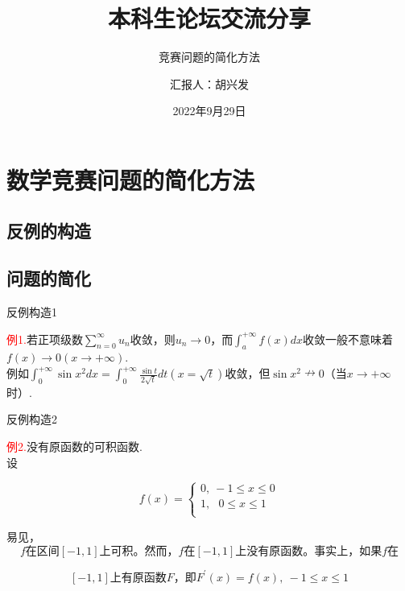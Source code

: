 \documentclass{beamer}
\author{汇报人：胡兴发} %
\title{本科生论坛交流分享} %
\subtitle{竞赛问题的简化方法} %
\institute{数理科学学院}
\date{2022年9月29日} %
\institute[IaHS]{指导老师：张本龚}
\begin{document}
\kaishu
\begin{frame}
    \titlepage
\end{frame}






\section{数学竞赛问题的简化方法}
\subsection{反例的构造}
\subsection{问题的简化}


\begin{frame}{反例构造1}
\begin{spacing}{2.0}
\textcolor{red}{例1.}若正项级数$\sum\limits_{n=0}^{\infty}u_n$收敛，则$u_n\to 0$，而$\int_{a}^{+\infty}f(x)dx $收敛一般不意味着$f(x)\to 0(x\to  +\infty)$.\\ \vspace{.5cm}例如$\int_{0}^{+\infty}\sin x^2dx =  \int_{0}^{+\infty} \frac{\sin t}{2\sqrt t}dt(x=\sqrt t)$收敛，但$\sin x^2\nrightarrow 0$（当$x\to +\infty$时）.
	\end{spacing}
\end{frame}

\begin{frame}{反例构造2}
	
	\begin{spacing}{2.0}

		\textcolor{red}{例2.}没有原函数的可积函数.\\
		设
		
		$$
		f\left( x \right) =\left\{ 
			\begin{array}{l}
			0,\ -1\le x\le 0\\
			1,\ \ \ 0\le x\le 1\\
			\end{array} \right. 
		$$
		
		易见，
		$$
		f
		\text{在区间}\left[ -1,1 \right] 
		\text{上可积。然而，}f\text{在}\left[ -1,1 \right] 
		\text{上没有原函数。事实上，如果}f\text{在}
		$$

		$$
		\left[ -1,1 \right] \text{上有原函数}F\text{，即}F^{'}\left( x \right) =f\left( x \right) ,\ -1\le x\le 1
		$$
	
		
	\end{spacing}
\end{frame}
\end{document}
